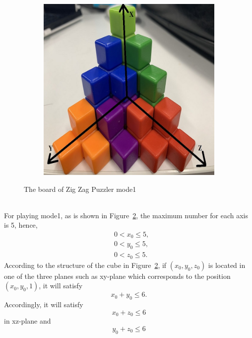 \begin{figure}[htbp]
\begin{subfigure}[b]{.45\textwidth}
\includegraphics[width=\textwidth]{figs/3Dboard1.jpg}
\caption{}
\label{figure:mode1B}
\end{subfigure}
\caption{The board of Zig Zag Puzzler mode1}
  \label{fig:board1}
\end{figure}
\\For playing mode1, as is shown in Figure~\ref{fig:board1}, the maximum number for each axis is 5, hence,
\begin{equation}
\begin{aligned}
&0<x_{0}\leq5,\\
&0<y_{0}\leq5,\\
&0<z_{0}\leq5.
\end{aligned}
\end{equation}
According to the structure of the cube in Figure~\ref{fig:board1}, if $(x_{0},y_{0},z_{0})$ is located in one of the three planes such as xy-plane which corresponds to the position $(x_{0},y_{0},1)$, it will satisfy
\begin{equation}
x_{0}+y_{0}\leq6.
\end{equation}
Accordingly, it will satisfy 
\begin{equation}
x_{0}+z_{0}\leq6
\end{equation}
in xz-plane and 
\begin{equation}
y_{0}+z_{0}\leq6
\end{equation}
